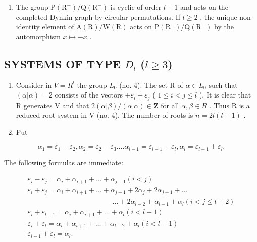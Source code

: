 \begin{enumerate}
\def\labelenumi{(\Roman{enumi})}
\setcounter{enumi}{11}
\tightlist
\item
  The group \(\mathrm{P}(\mathrm{R}^{-})/\mathrm{Q}(\mathrm{R}^{-})\) is cyclic of order \(l+1\) and acts on the completed Dynkin graph by circular permutations. If \(l\geqslant2\) , the unique non-identity element of \(\mathrm{A}(\mathrm{R})/\mathrm{W}(\mathrm{R})\) acts on \(\mathrm{P}(\mathrm{R}^{-})/\mathrm{Q}(\mathrm{R}^{-})\) by the automorphism \(x\mapsto-x\) .
\end{enumerate}

\subsection{\texorpdfstring{SYSTEMS OF TYPE \(D_{l}\) (\(l \geqslant 3\))}{SYSTEMS OF TYPE D\_l (l >= 3)}}

\begin{enumerate}
\def\labelenumi{(\Roman{enumi})}
\item
  Consider in \(V = R^{l}\) the group \(L_{0}\) (no. 4). The set R of \(\alpha \in L_{0}\) such that \((\alpha|\alpha) = 2\) consists of the vectors \(\pm\varepsilon_{i} \pm \varepsilon_{j}\) ( \(1 \leqslant i < j \leqslant l\) ). It is clear that R generates V and that \(2(\alpha|\beta)/(\alpha|\alpha) \in \mathbf{Z}\) for all \(\alpha, \beta \in R\) . Thus R is a reduced root system in V (no. 4). The number of roots is \(n = 2l(l - 1)\) .
\item
  Put
\end{enumerate}

\[
\alpha_ {1} = \varepsilon_ {1} - \varepsilon_ {2}, \alpha_ {2} = \varepsilon_ {2} - \varepsilon_ {3} \dots . \alpha_ {l - 1} = \varepsilon_ {l - 1} - \varepsilon_ {l}, \alpha_ {l} = \varepsilon_ {l - 1} + \varepsilon_ {l}.
\]

The following formulas are immediate:

\[
\begin{array}{c} \varepsilon_ {i} - \varepsilon_ {j} = \alpha_ {i} + \alpha_ {i + 1} + \dots + \alpha_ {j - 1} (i <   j) \\ \varepsilon_ {i} + \varepsilon_ {j} = \alpha_ {i} + \alpha_ {i + 1} + \dots + \alpha_ {j - 1} + 2 \alpha_ {j} + 2 \alpha_ {j + 1} + \dots \\ \qquad \qquad \qquad \qquad \qquad \qquad \dots + 2 \alpha_ {l - 2} + \alpha_ {l - 1} + \alpha_ {l} (i <   j \leqslant l - 2) \\ \varepsilon_ {i} + \varepsilon_ {l - 1} = \alpha_ {i} + \alpha_ {i + 1} + \dots + \alpha_ {l} (i <   l - 1) \\ \varepsilon_ {i} + \varepsilon_ {l} = \alpha_ {i} + \alpha_ {i + 1} + \dots + \alpha_ {l - 2} + \alpha_ {l} (i <   l - 1) \\ \varepsilon_ {l - 1} + \varepsilon_ {l} = \alpha_ {l}. \end{array}
\]

